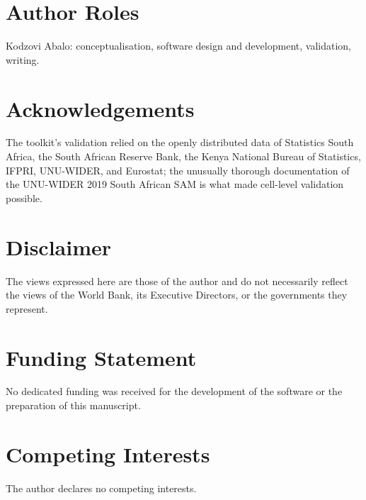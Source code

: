 \documentclass[11pt,a4paper]{article}
\begin{document}
\section*{Author Roles}
Kodzovi Abalo: conceptualisation, software design and development,
validation, writing.

\section*{Acknowledgements}
The toolkit's validation relied on the openly distributed data of
Statistics South Africa, the South African Reserve Bank, the Kenya
National Bureau of Statistics, IFPRI, UNU-WIDER, and Eurostat; the
unusually thorough documentation of the UNU-WIDER 2019 South African SAM
\cite{vanseventer2023} is what made cell-level validation possible.

\section*{Disclaimer}
The views expressed here are those of the author and do not necessarily
reflect the views of the World Bank, its Executive Directors, or the
governments they represent.

\section*{Funding Statement}
No dedicated funding was received for the development of the software or
the preparation of this manuscript.

\section*{Competing Interests}
The author declares no competing interests.



\end{document}

